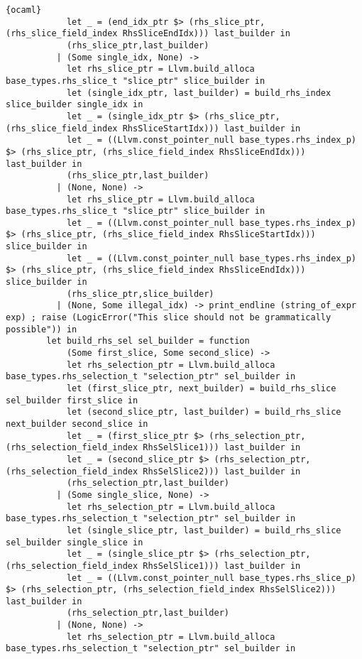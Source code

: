 \begin{lstlisting}{ocaml}
            let _ = (end_idx_ptr $> (rhs_slice_ptr, (rhs_slice_field_index RhsSliceEndIdx))) last_builder in
            (rhs_slice_ptr,last_builder)
          | (Some single_idx, None) ->
            let rhs_slice_ptr = Llvm.build_alloca base_types.rhs_slice_t "slice_ptr" slice_builder in
            let (single_idx_ptr, last_builder) = build_rhs_index slice_builder single_idx in
            let _ = (single_idx_ptr $> (rhs_slice_ptr, (rhs_slice_field_index RhsSliceStartIdx))) last_builder in
            let _ = ((Llvm.const_pointer_null base_types.rhs_index_p) $> (rhs_slice_ptr, (rhs_slice_field_index RhsSliceEndIdx))) last_builder in
            (rhs_slice_ptr,last_builder)
          | (None, None) ->
            let rhs_slice_ptr = Llvm.build_alloca base_types.rhs_slice_t "slice_ptr" slice_builder in
            let _ = ((Llvm.const_pointer_null base_types.rhs_index_p) $> (rhs_slice_ptr, (rhs_slice_field_index RhsSliceStartIdx))) slice_builder in
            let _ = ((Llvm.const_pointer_null base_types.rhs_index_p) $> (rhs_slice_ptr, (rhs_slice_field_index RhsSliceEndIdx))) slice_builder in
            (rhs_slice_ptr,slice_builder)
          | (None, Some illegal_idx) -> print_endline (string_of_expr exp) ; raise (LogicError("This slice should not be grammatically possible")) in
        let build_rhs_sel sel_builder = function
            (Some first_slice, Some second_slice) ->
            let rhs_selection_ptr = Llvm.build_alloca base_types.rhs_selection_t "selection_ptr" sel_builder in
            let (first_slice_ptr, next_builder) = build_rhs_slice sel_builder first_slice in
            let (second_slice_ptr, last_builder) = build_rhs_slice next_builder second_slice in
            let _ = (first_slice_ptr $> (rhs_selection_ptr, (rhs_selection_field_index RhsSelSlice1))) last_builder in
            let _ = (second_slice_ptr $> (rhs_selection_ptr, (rhs_selection_field_index RhsSelSlice2))) last_builder in
            (rhs_selection_ptr,last_builder)
          | (Some single_slice, None) ->
            let rhs_selection_ptr = Llvm.build_alloca base_types.rhs_selection_t "selection_ptr" sel_builder in
            let (single_slice_ptr, last_builder) = build_rhs_slice sel_builder single_slice in
            let _ = (single_slice_ptr $> (rhs_selection_ptr, (rhs_selection_field_index RhsSelSlice1))) last_builder in
            let _ = ((Llvm.const_pointer_null base_types.rhs_slice_p) $> (rhs_selection_ptr, (rhs_selection_field_index RhsSelSlice2))) last_builder in
            (rhs_selection_ptr,last_builder)
          | (None, None) ->
            let rhs_selection_ptr = Llvm.build_alloca base_types.rhs_selection_t "selection_ptr" sel_builder in

\end{lstlisting}
